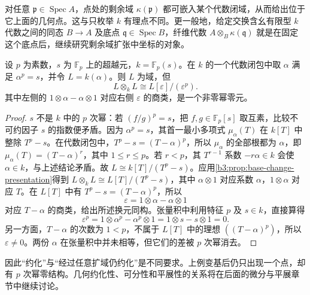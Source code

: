\ProseParagraphBreak
对任意 \(\mathfrak p\in\operatorname{Spec}A\)，点处的剩余域 \(\kappa(\mathfrak p)\) 都可嵌入某个代数闭域，从而给出位于它上面的几何点。这与只枚举 \(k\) 有理点不同。更一般地，给定交换含幺有限型 \(k\) 代数之间的同态 \(B\to A\) 及底点 \(\mathfrak q\in\operatorname{Spec}B\)，纤维代数 \(A\otimes_B\kappa(\mathfrak q)\) 就是在固定这个底点后，继续研究剩余域扩张中坐标的对象。

\begin{example}[变基后的非约化性]\label{b3:exm:inseparable-geometric-thickening}
	设 \(p\) 为素数，\(s\) 为 \(\mathbb F_p\) 上的超越元，\(k=\mathbb F_p(s)\)。在 \(k\) 的一个代数闭包中取 \(\alpha\) 满足 \(\alpha^p=s\)，并令 \(L=k(\alpha)\)。则 \(L\) 为域，但
	\[
		L\otimes_kL\cong L[\varepsilon]/(\varepsilon^p).
	\]
	其中左侧的 \(1\otimes\alpha-\alpha\otimes1\) 对应右侧 \(\varepsilon\) 的商类，是一个非零幂零元。
\end{example}
\begin{proof}
	\(s\) 不是 \(k\) 中的 \(p\) 次幂：若 \((f/g)^p=s\)，把 \(f,g\in\mathbb F_p[s]\) 取互素，比较不可约因子 \(s\) 的指数便矛盾。因为 \(\alpha^p=s\)，其首一最小多项式 \(\mu_\alpha(T)\) 在 \(k[T]\) 中整除 \(T^p-s\)。在代数闭包中，\(T^p-s=(T-\alpha)^p\)，所以 \(\mu_\alpha\) 的全部根都为 \(\alpha\)，即 \(\mu_\alpha(T)=(T-\alpha)^r\)，其中 \(1\le r\le p\)。若 \(r<p\)，其 \(T^{r-1}\) 系数 \(-r\alpha\in k\) 会使 \(\alpha\in k\)，与上述结论矛盾。故 \(L\cong k[T]/(T^p-s)\)。应用\cref{b3:prop:base-change-presentation}得到 \(L\otimes_kL\cong L[T]/(T^p-s)\)，其中 \(\alpha\otimes1\) 对应系数 \(\alpha\)，\(1\otimes\alpha\) 对应 \(T\)。在 \(L[T]\) 中有 \(T^p-s=(T-\alpha)^p\)，所以
	\[
		\varepsilon=1\otimes\alpha-\alpha\otimes1
	\]
	对应 \(T-\alpha\) 的商类，给出所述换元同构。张量积中利用特征 \(p\) 及 \(s\in k\)，直接算得
	\[
		\varepsilon^p=1\otimes\alpha^p-\alpha^p\otimes1 =1\otimes s-s\otimes1=0.
	\]
	另一方面，\(T-\alpha\) 的次数为 \(1<p\)，不属于 \(L[T]\) 中的理想 \(((T-\alpha)^p)\)，所以 \(\varepsilon\ne0\)。两份 \(\alpha\) 在张量积中并未相等，但它们的差被 \(p\) 次幂消去。
\end{proof}

因此“约化”与“经过任意扩域仍约化”是不同要求。上例变基后仍只出现一个点，却有 \(p\) 次幂零结构。几何约化性、可分性和平展性的关系将在后面的微分与平展章节中继续讨论。
